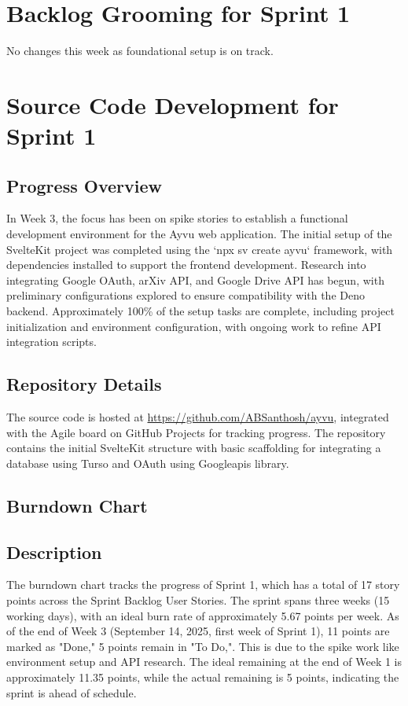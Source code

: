 \documentclass[12pt]{article}
\begin{document}
\section{Backlog Grooming for Sprint 1}
No changes this week as foundational setup is on track.

\section{Source Code Development for Sprint 1}

\subsection{Progress Overview}
In Week 3, the focus has been on spike stories to establish a functional development environment for the Ayvu web application. The initial setup of the SvelteKit project was completed using the `npx sv create ayvu` framework, with dependencies installed to support the frontend development. Research into integrating Google OAuth, arXiv API, and Google Drive API has begun, with preliminary configurations explored to ensure compatibility with the Deno backend. Approximately 100\% of the setup tasks are complete, including project initialization and environment configuration, with ongoing work to refine API integration scripts.

\subsection{Repository Details}
The source code is hosted at \href{https://github.com/ABSanthosh/ayvu}{https://github.com/ABSanthosh/ayvu}, integrated with the Agile board on GitHub Projects for tracking progress. The repository contains the initial SvelteKit structure with basic scaffolding for integrating a database using Turso and OAuth using Googleapis library.

\subsection{Burndown Chart}

\subsection{Description}
The burndown chart tracks the progress of Sprint 1, which has a total of 17 story points across the Sprint Backlog User Stories. The sprint spans three weeks (15 working days), with an ideal burn rate of approximately 5.67 points per week. As of the end of Week 3 (September 14, 2025, first week of Sprint 1), 11 points are marked as "Done," 5 points remain in "To Do,". This is due to the spike work like environment setup and API research. The ideal remaining at the end of Week 1 is approximately 11.35 points, while the actual remaining is 5 points, indicating the sprint is ahead of schedule.
\end{document}
